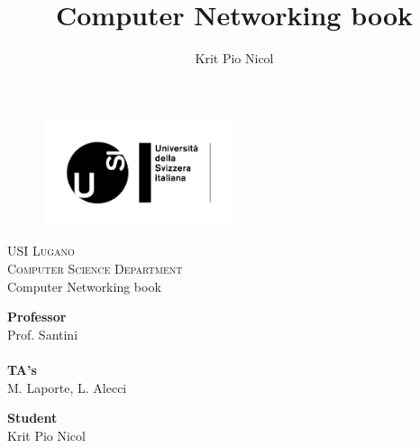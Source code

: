 \documentclass[a4paper]{report}
\author{Krit Pio Nicol}
\title{Computer Networking book}
\begin{document}

\begin{titlepage}
\begin{figure}[t]
    \centering\includegraphics[width=0.5\textwidth]{Figures/usilogo.png}
\end{figure}

\begin{center}
    \textsc{\LARGE{USI Lugano\\}}
	\textsc{ \LARGE{Computer Science Department\\ }}
	\vspace{40mm}
	\fontsize{10mm}{7mm}\selectfont 
    \textup{Computer Networking book}\\
\end{center}

\vspace{25mm}

\begin{minipage}[t]{0.47\textwidth}
	\textnormal{\large{\bf Professor\\}}
	{\large Prof. Santini\\ \\}
 \textnormal{\large{\bf TA's\\}}
	{\large M. Laporte, L. Alecci}
\end{minipage}\hfill\begin{minipage}[t]{0.47\textwidth}\raggedleft
	\textnormal{\large{\bf Student\\}}
	{\large Krit Pio Nicol}
\end{minipage}

\vspace{20mm}


\end{titlepage}
\end{document}
